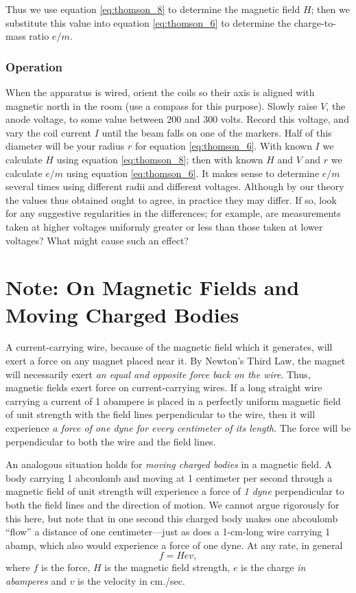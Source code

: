 Thus we use equation \eqref{eq:thomson_8} to determine the magnetic field $H$; then
we substitute this value into equation \eqref{eq:thomson_6} to determine the
charge-to-mass ratio $e/m$.

\subsubsection*{Operation}

When the apparatus is wired, orient the coils so their axis is aligned
with magnetic north in the room (use a compass for
this purpose). Slowly raise $V$, the anode voltage, to some value between 200 and 300 volts. 
Record this voltage, and vary the coil current $I$ until the beam falls on one
of the markers. Half of this diameter will be your radius $r$ for equation \eqref{eq:thomson_6}. 
With known $I$ we calculate $H$ using equation
\eqref{eq:thomson_8}; then with known $H$ and $V$ and $r$ we calculate
$e/m$ using equation \eqref{eq:thomson_6}. It makes sense to determine $e/m$
several times using different radii and different voltages. Although by
our theory the values thus obtained ought to agree, in practice they may
differ. If so, look for any suggestive regularities in the differences;
for example, are measurements taken at higher voltages uniformly greater
or less than those taken at lower voltages? What might cause such an
effect?


\section*{Note: On Magnetic Fields and Moving Charged Bodies}\label{n:thomson}

A current-carrying wire, because of the magnetic field which it generates,
will exert a force on any magnet placed near it. By Newton's Third Law,
the magnet will necessarily exert \emph{an equal and opposite force back
on the wire}. Thus, magnetic fields exert force on current-carrying
wires. If a long straight wire carrying a current of 1 abampere is
placed in a perfectly uniform magnetic field of unit strength with the
field lines perpendicular to the wire, then it will experience \emph{a
force of one dyne for every centimeter of its length}. The force will be
perpendicular to both the wire and the field lines.

An analogous situation holds for \emph{moving charged bodies} in a
magnetic field. A body carrying 1 abcoulomb and moving at 1 centimeter
per second through a magnetic field of unit strength will experience a
force of \emph{1 dyne} perpendicular to both the field lines and the
direction of motion. We cannot argue rigorously for this here, but note
that in one second this charged body makes one abcoulomb ``flow'' a
distance of one centimeter---just as does a 1-cm-long wire carrying 1
abamp, which also would experience a force of one dyne. At any rate, in
general
\begin{equation*}
f = Hev ,
\end{equation*}
where $f$ is the force, $H$ is the magnetic field strength,
$e$ is the charge \emph{in abamperes} and $v$ is the velocity
in cm./sec.

